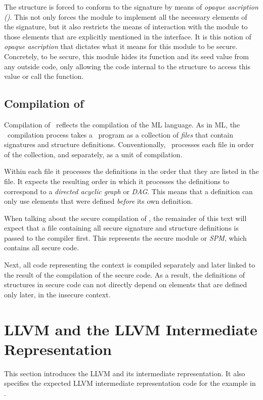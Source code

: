 The  structure is forced to conform to the signature  by means of \emph{opaque ascription (\lsttext{:>})}.
This not only forces the module to implement all the necessary elements of the signature, but it also restricts the means of interaction with the module to those elements that are explicitly mentioned in the interface.
It is this notion of \emph{opaque ascription} that dictates what it means for this module to be secure.
Concretely, to be secure, this module hides its  function and its seed value from any outside code, only allowing the code internal to the structure to access this value or call the function.

\subsection{Compilation of \MiniML}
\label{sec:DefinitionOfCompilation}
Compilation of \MiniML\ reflects the compilation of the ML language.
As in ML, the \MiniML\ compilation process takes a \MiniML\ program as a collection of \emph{files} that contain signatures and structure definitions.
Conventionally, \MiniML\ processes each file in order of the collection, and separately, as a unit of compilation.

Within each file it processes the definitions in the order that they are listed in the file. It expects the resulting order in which it processes the definitions to correspond to a \emph{directed acyclic graph} or \emph{DAG}.
This means that a definition can only use elements that were defined \emph{before} its own definition.

When talking about the secure compilation of \MiniML, the remainder of this text will expect that a file containing all secure signature and structure definitions is passed to the compiler first.
This represents the secure module or \emph{SPM}, which contains all secure code.

Next, all code representing the context is compiled separately and later linked to the result of the compilation of the secure code.
As a result, the definitions of structures in secure code can not directly depend on elements that are defined only later, in the insecure context.


\section{LLVM and the LLVM Intermediate Representation}
\label{sec:LLVM}
This section introduces the LLVM and its intermediate representation.
It also specifies the expected LLVM intermediate representation code for the example in .

